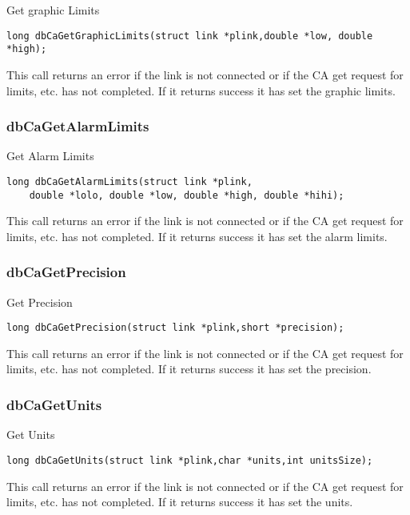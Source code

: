 Get graphic Limits

\begin{verbatim}
long dbCaGetGraphicLimits(struct link *plink,double *low, double *high);
\end{verbatim}

This call returns an error if the link is not connected or if the CA get request for limits, etc. has not completed. If it returns 
success it has set the graphic limits.

\subsubsection{dbCaGetAlarmLimits}

Get Alarm Limits

\begin{verbatim}
long dbCaGetAlarmLimits(struct link *plink,
    double *lolo, double *low, double *high, double *hihi);
\end{verbatim}

This call returns an error if the link is not connected or if the CA get request for limits, etc. has not completed. If it returns 
success it has set the alarm limits.

\subsubsection{dbCaGetPrecision}

Get Precision

\begin{verbatim}
long dbCaGetPrecision(struct link *plink,short *precision);
\end{verbatim}

This call returns an error if the link is not connected or if the CA get request for limits, etc. has not completed. If it returns 
success it has set the precision.

\subsubsection{dbCaGetUnits}

Get Units

\begin{verbatim}
long dbCaGetUnits(struct link *plink,char *units,int unitsSize);
\end{verbatim}

This call returns an error if the link is not connected or if the CA get request for limits, etc. has not completed. If it returns 
success it has set the units.
